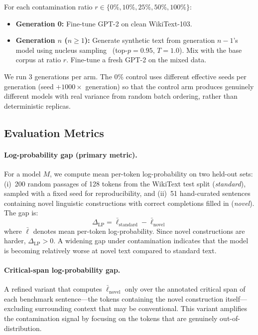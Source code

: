 \documentclass{article}
\begin{document}
For each contamination ratio $r \in \{0\%, 10\%, 25\%, 50\%, 100\%\}$:

\begin{itemize}[leftmargin=*]
  \item \textbf{Generation 0:} Fine-tune GPT-2 on clean WikiText-103.
  \item \textbf{Generation $n$ ($n \geq 1$):} Generate synthetic text from generation $n{-}1$'s model using nucleus sampling~\citep{holtzman2020curious} (top-$p = 0.95$, $T = 1.0$). Mix with the base corpus at ratio $r$. Fine-tune a fresh GPT-2 on the mixed data.
\end{itemize}

We run 3 generations per arm.
The 0\% control uses different effective seeds per generation (seed $+ 1000 \times$ generation) so that the control arm produces genuinely different models with real variance from random batch ordering, rather than deterministic replicas.

\subsection{Evaluation Metrics}

\paragraph{Log-probability gap (primary metric).}
For a model $M$, we compute mean per-token log-probability on two held-out sets: (i)~200 random passages of 128 tokens from the WikiText test split (\emph{standard}), sampled with a fixed seed for reproducibility, and (ii)~51 hand-curated sentences containing novel linguistic constructions with correct completions filled in (\emph{novel}).
The gap is:
\begin{equation}
  \Delta_{\text{LP}} = \bar{\ell}_{\text{standard}} - \bar{\ell}_{\text{novel}}
  \label{eq:gap}
\end{equation}
where $\bar{\ell}$ denotes mean per-token log-probability.
Since novel constructions are harder, $\Delta_{\text{LP}} > 0$.
A widening gap under contamination indicates that the model is becoming relatively worse at novel text compared to standard text.

\paragraph{Critical-span log-probability gap.}
A refined variant that computes $\bar{\ell}_{\text{novel}}$ only over the annotated critical span of each benchmark sentence---the tokens containing the novel construction itself---excluding surrounding context that may be conventional.
This variant amplifies the contamination signal by focusing on the tokens that are genuinely out-of-distribution.
\end{document}
